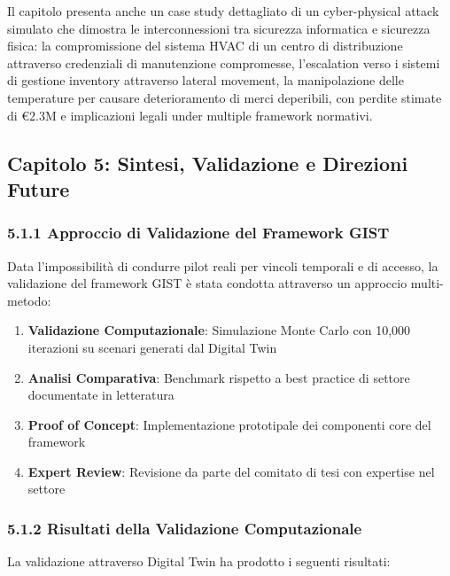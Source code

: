 Il capitolo presenta anche un case study dettagliato di un cyber-physical attack simulato che dimostra le interconnessioni tra sicurezza informatica e sicurezza fisica: la compromissione del sistema HVAC di un centro di distribuzione attraverso credenziali di manutenzione compromesse, l'escalation verso i sistemi di gestione inventory attraverso lateral movement, la manipolazione delle temperature per causare deterioramento di merci deperibili, con perdite stimate di €2.3M e implicazioni legali under multiple framework normativi.

\subsection{Capitolo 5: Sintesi, Validazione e Direzioni Future}


\subsubsection{5.1.1 Approccio di Validazione del Framework GIST}

Data l'impossibilità di condurre pilot reali per vincoli temporali 
e di accesso, la validazione del framework GIST è stata condotta 
attraverso un approccio multi-metodo:

\begin{enumerate}
\item \textbf{Validazione Computazionale}: Simulazione Monte Carlo 
      con 10,000 iterazioni su scenari generati dal Digital Twin
      
\item \textbf{Analisi Comparativa}: Benchmark rispetto a best practice 
      di settore documentate in letteratura
      
\item \textbf{Proof of Concept}: Implementazione prototipale dei 
      componenti core del framework
      
\item \textbf{Expert Review}: Revisione da parte del comitato di tesi 
      con expertise nel settore
\end{enumerate}

\subsubsection{5.1.2 Risultati della Validazione Computazionale}

La validazione attraverso Digital Twin ha prodotto i seguenti risultati:

